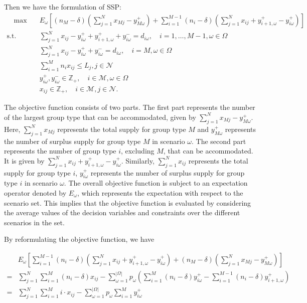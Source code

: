 Then we have the formulation of SSP:
    \begin{align}
    \quad \max \quad & E_{\omega}\left[(n_{M}-\delta) (\sum_{j= 1}^{N} x_{Mj} - y_{M \omega}^{+}) + \sum_{i=1}^{M-1} (n_i-\delta) (\sum_{j= 1}^{N} x_{ij} + y_{i+1,\omega}^{+} - y_{i \omega}^{+})\right] \\
    \text {s.t.} \quad & \sum_{j= 1}^{N} x_{ij}-y_{i \omega}^{+}+
    y_{i+1, \omega}^{+} + y_{i \omega}^{-}=d_{i \omega}, \quad i = 1,\ldots, M-1, \omega \in \Omega \label{DEF_constr1} \\
    & \sum_{j= 1}^{N} x_{ij} -y_{i \omega}^{+}+y_{i \omega}^{-}=d_{i \omega}, \quad i = M, \omega \in \Omega \label{DEF_constr2}\\
    & \sum_{i=1}^{M} n_{i} x_{ij} \leq L_j, j \in \mathcal{N}  \label{DEF_constr3} \\
    & y_{i \omega}^{+}, y_{i \omega}^{-} \in \mathbb{Z}_{+}, \quad i \in \mathcal{M}, \omega \in \Omega \\
    & x_{ij} \in \mathbb{Z}_{+}, \quad i \in \mathcal{M}, j \in \mathcal{N}.
    \end{align}

The objective function consists of two parts. The first part represents the number of the largest group type that can be accommodated, given by $\sum_{j=1}^{N} x_{Mj} - y_{M\omega}^{+}$. Here, $\sum_{j=1}^{N} x_{Mj}$ represents the total supply for group type $M$ and $y_{M\omega}^{+}$ represents the number of surplus supply for group type $M$ in scenario $\omega$. The second part represents the number of group type $i$, excluding $M$, that can be accommodated. It is given by $\sum_{j=1}^{N} x_{ij} + y_{i+1,\omega}^{+} - y_{i\omega}^{+}$. Similarly, $\sum_{j=1}^{N} x_{ij}$ represents the total supply for group type $i$, $y_{i\omega}^{+}$ represents the number of surplus supply for group type $i$ in scenario $\omega$. The overall objective function is subject to an expectation operator denoted by $E_{\omega}$, which represents the expectation with respect to the scenario set. This implies that the objective function is evaluated by considering the average values of the decision variables and constraints over the different scenarios in the set.


By reformulating the objective function, we have

\begin{align*}
  & E_{\omega}\left[\sum_{i=1}^{M-1} (n_i-\delta) (\sum_{j= 1}^{N} x_{ij} + y_{i+1,\omega}^{+} - y_{i \omega}^{+}) + (n_M-\delta) (\sum_{j= 1}^{N} x_{Mj} - y_{M \omega}^{+})\right] \\
  =& \sum_{j =1}^{N} \sum_{i=1}^M (n_i- \delta) x_{ij} - \sum_{\omega =1}^{|\Omega|} p_{\omega} \left(\sum_{i=1}^{M}(n_i- \delta)y_{i \omega}^{+} - \sum_{i=1}^{M-1}(n_i-\delta)y_{i+1, \omega}^{+}\right) \\
  =& \sum_{j =1}^{N} \sum_{i=1}^M i \cdot x_{ij} - \sum_{\omega =1}^{|\Omega|} p_{\omega} \sum_{i = 1}^{M} y_{i \omega}^{+}
\end{align*}

